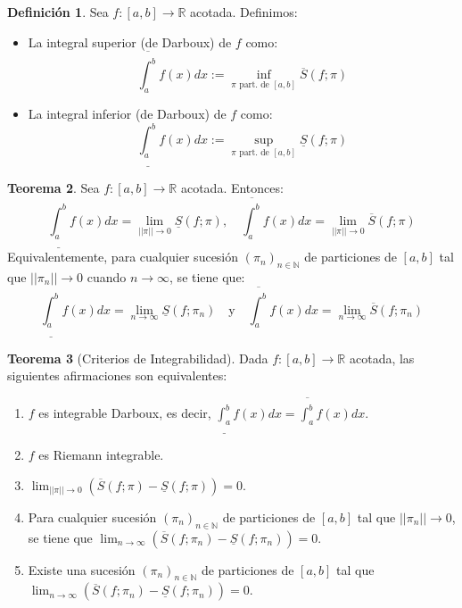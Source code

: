 \documentclass[11pt]{article}
\theoremstyle{definition} %
\newtheorem{theorem}{Teorema}[section]
\newtheorem{definition}[theorem]{Definición}
\begin{document}
\begin{definition}
Sea $f:[a,b] \rightarrow \mathbb{R}$ acotada. Definimos:
\begin{itemize}
    \item La integral superior (de Darboux) de $f$ como:
    $$ \overline{\int_{a}^{b}} f(x)dx := \inf_{\pi \text{ part. de } [a,b]} \overline{S}(f; \pi) $$
    \item La integral inferior (de Darboux) de $f$ como:
    $$ \underline{\int_{a}^{b}} f(x)dx := \sup_{\pi \text{ part. de } [a,b]} \underline{S}(f; \pi) $$
\end{itemize}
\end{definition}

\begin{theorem}
Sea $f:[a,b] \rightarrow \mathbb{R}$ acotada. Entonces:
$$ \underline{\int_{a}^{b}} f(x)dx = \lim_{||\pi|| \rightarrow 0} \underline{S}(f; \pi), \quad \overline{\int_{a}^{b}} f(x)dx = \lim_{||\pi|| \rightarrow 0} \overline{S}(f; \pi) $$
Equivalentemente, para cualquier sucesión $(\pi_n)_{n \in \mathbb{N}}$ de particiones de $[a,b]$ tal que $||\pi_n|| \rightarrow 0$ cuando $n \rightarrow \infty$, se tiene que:
$$ \underline{\int_{a}^{b}} f(x)dx = \lim_{n \rightarrow \infty} \underline{S}(f; \pi_n) \quad \text{y} \quad \overline{\int_{a}^{b}} f(x)dx = \lim_{n \rightarrow \infty} \overline{S}(f; \pi_n) $$
\end{theorem}

\begin{theorem}[Criterios de Integrabilidad]
Dada $f:[a,b] \rightarrow \mathbb{R}$ acotada, las siguientes afirmaciones son equivalentes:
\begin{enumerate}
    \item $f$ es integrable Darboux, es decir, $\underline{\int_{a}^{b}} f(x)dx = \overline{\int_{a}^{b}} f(x)dx$.
    \item $f$ es Riemann integrable.
    \item $\lim_{||\pi|| \rightarrow 0} (\overline{S}(f; \pi) - \underline{S}(f; \pi)) = 0$.
    \item Para cualquier sucesión $(\pi_n)_{n \in \mathbb{N}}$ de particiones de $[a,b]$ tal que $||\pi_n|| \rightarrow 0$, se tiene que $\lim_{n \rightarrow \infty} (\overline{S}(f; \pi_n) - \underline{S}(f; \pi_n)) = 0$.
    \item Existe una sucesión $(\pi_n)_{n \in \mathbb{N}}$ de particiones de $[a,b]$ tal que $\lim_{n \rightarrow \infty} (\overline{S}(f; \pi_n) - \underline{S}(f; \pi_n)) = 0$.
\end{enumerate}
\end{theorem}
\end{document}
